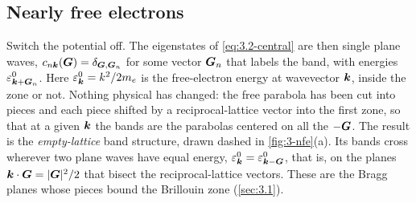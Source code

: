 \subsection{Nearly free electrons}

Switch the potential off. The eigenstates of \cref{eq:3.2-central} are then single plane waves, $c_{n\bm{k}}(\bm{G}) = \delta_{\bm{G},\bm{G}_n}$ for some vector $\bm{G}_n$ that labels the band, with energies $\varepsilon^0_{\bm{k}+\bm{G}_n}$. Here $\varepsilon^0_{\bm{k}} = k^2/2m_e$ is the free-electron energy at wavevector $\bm{k}$, inside the zone or not. Nothing physical has changed: the free parabola has been cut into pieces and each piece shifted by a reciprocal-lattice vector into the first zone, so that at a given $\bm{k}$ the bands are the parabolas centered on all the $-\bm{G}$. The result is the \emph{empty-lattice} band structure, drawn dashed in \cref{fig:3-nfe}(a). Its bands cross wherever two plane waves have equal energy, $\varepsilon^0_{\bm{k}} = \varepsilon^0_{\bm{k}-\bm{G}}$, that is, on the planes $\bm{k}\cdot\bm{G} = |\bm{G}|^2/2$ that bisect the reciprocal-lattice vectors. These are the Bragg planes whose pieces bound the Brillouin zone (\cref{sec:3.1}).

